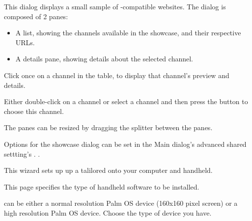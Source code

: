 This dialog displays a small sample of \brandingapplicationsuitename-compatible websites. The dialog
is composed of 2 panes:

\begin{itemize}
  \item A list, showing the channels available in the showcase, and their
  respective URLs.

  \item A details pane, showing details about the selected channel.
\end{itemize}

Click once on a channel in the table, to display that channel's preview and
details. 

Either double-click on a channel or select a channel and then press
the  button to choose this channel.

The panes can be resized by dragging the splitter between the panes.

Options for the showcase dialog can be set in the Main dialog's advanced 
shared settting's 
\helpignore{\ref{sec:pd-preferences-dialog-showcase-tab}}
.
.

This wizard sets up up a talilored \brandingapplicationsuitename onto your computer and 
handheld.


This page specifies the type of handheld software to be installed.

 can be either a normal resolution
Palm OS device (160x160 pixel screen) or a high resolution Palm OS device.
Choose the type of device you have.

